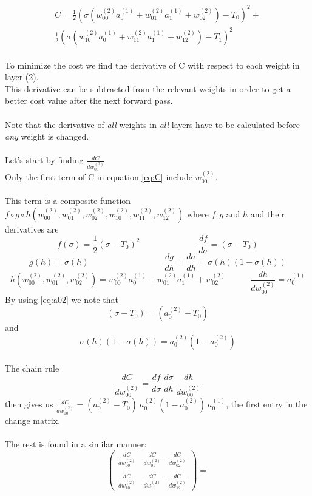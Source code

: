 \documentclass{article}
\begin{document}
\begin{equation} \label{eq:C} 
\begin{aligned}
C = \frac {1}{2}(\sigma(w_{00}^{(2)}a_0^{(1)}+w_{01}^{(2)}a_1^{(1)}+w_{02}^{(2)})-T_0)^2 + 
\\
\frac {1}{2}(\sigma(w_{10}^{(2)}a_0^{(1)}+w_{11}^{(2)}a_1^{(1)}+w_{12}^{(2)})-T_1)^2
\end{aligned}
\end{equation}
\\
To minimize the cost we find the derivative of C with respect to each weight in layer (2).
\\
This derivative can be subtracted from the relevant weights in order to get a better cost value after the next forward pass.
\\
\\
Note that the derivative of \textit{all} weights in \textit{all} layers have to be calculated before \textit{any} weight is changed.
\\
\\
Let's start by finding $\frac{dC}{dw_{00}^{(2)}}$
\\
Only the first term of C in equation \eqref{eq:C} include $w_{00}^{(2)}$.
\\
\\
This term is a composite function $f \circ g \circ h(w_{00}^{(2)}, w_{01}^{(2)}, w_{02}^{(2)}, w_{10}^{(2)}, w_{11}^{(2)},w_{12}^{(2)})$ where $f, g$ and $h$ and their derivatives are
$$f(\sigma) = \frac {1}{2}(\sigma-T_0)^2~~~~~~~~~~~~~~~~~~~~~~~~~~~~~~~\frac{df}{d\sigma} = (\sigma-T_0)$$
$$g(h) = \sigma(h)~~~~~~~~~~~~~~~~~~~~~~~~~~~~~~~~~~~~~~~~\frac{dg}{dh} = \frac{d\sigma}{dh} = \sigma(h)(1 - \sigma(h))$$ 
$$h(w_{00}^{(2)}, w_{01}^{(2)}, w_{02}^{(2)}) = w_{00}^{(2)}a_0^{(1)}+w_{01}^{(2)}a_1^{(1)}+w_{02}^{(2)}~~~~~~~~~~~~~\frac{dh}{dw_{00}^{(2)}} = a_0^{(1)}$$
By using  \eqref{eq:a02} we note that $$(\sigma - T_0) = (a_0^{(2)} - T_0)$$ and $$\sigma(h)(1-\sigma(h)) =a_0^{(2)}(1-a_0^{(2)})$$ 
\\ The chain rule $$\frac{dC}{dw_{00}^{(2)}} = \frac{df}{d\sigma}~\frac{d\sigma}{dh}~\frac{dh}{dw_{00}^{(2)}}$$ 
then gives us
$\frac{dC}{dw_{00}^{(2)}} = (a_0^{(2)}-T_0)~a_0^{(2)}(1-a_0^{(2)})~a_0^{(1)} $, the first entry in the change matrix.
\\
\\
The rest is found in a similar manner:
$$\begin{pmatrix}
\frac{dC}{dw_{00}^{(2)}} & \frac{dC}{dw_{01}^{(2)}} & \frac{dC}{dw_{02}^{(2)}}
\\\\
\frac{dC}{dw_{10}^{(2)}} & \frac{dC}{dw_{11}^{(2)}} & \frac{dC}{dw_{12}^{(2)}} 
\end{pmatrix} =
$$
\end{document}
